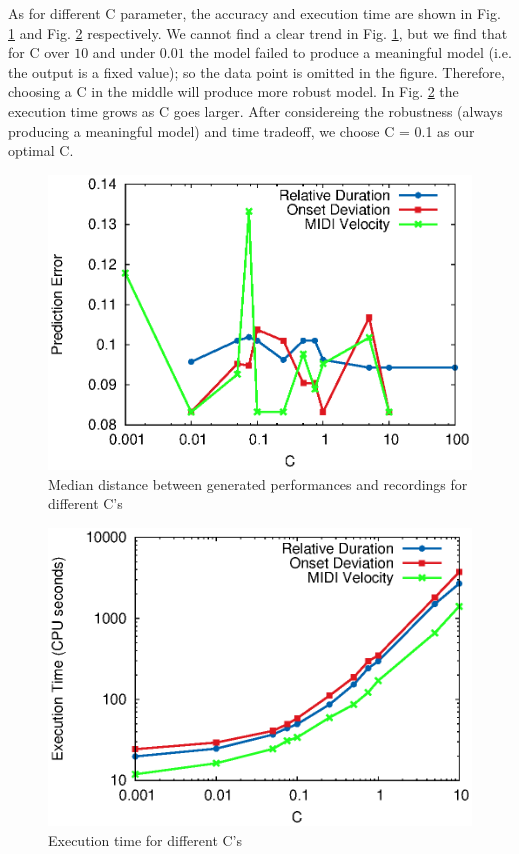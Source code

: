 As for different C parameter, the accuracy and execution time are shown in Fig. \ref{fig:c_accu} and Fig. \ref{fig:c_time} respectively. We cannot find a clear trend in Fig. \ref{fig:c_accu}, but we find that for C over $10$ and under $0.01$ the model failed to produce a meaningful model (i.e. the output is a fixed value); so the data point is omitted in the figure. Therefore, choosing a C in the middle will produce more robust model. In Fig. \ref{fig:c_time} the execution time grows as C goes larger. After considereing the robustness (always producing a meaningful model) and time tradeoff, we choose C = 0.1 as our optimal C.

\begin{figure}[tp]
   \begin{center}
      \includegraphics[width=\textwidth]{fig/C_accu}

   \end{center}
   \caption{Median distance between generated performances and recordings for different C's}
   \label{fig:c_accu}
\end{figure}
\begin{figure}[tp]
   \begin{center}
      \includegraphics[width=\textwidth]{fig/C_time}
   \end{center}
   \caption{Execution time for different C's}
   \label{fig:c_time}
\end{figure}
